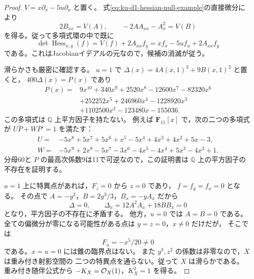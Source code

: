 \begin{proof}
$V=x\partial_x-5u\partial_u$ と置く。
式\eqref{eq:ku-d1-hessian-null-example}の直接微分により
\begin{equation}\label{eq:ku-d1-hessian-null-identities}
 2B_{xx}=V(A),\qquad -2AA_{xx}-A_x^2=V(B)
\end{equation}
を得る。従って多項式環の中で既に
\begin{equation}\label{eq:ku-d1-hessian-exact-syzygy}
 \det\operatorname{Hess}_{x,y}(f)
 =V(f)+2A_{xx}f_y
 =xf_x-5uf_u+2A_{xx}f_y
\end{equation}
である。これはJacobianイデアルの元なので，候補の消滅が従う。

滑らかさも厳密に確認する。
$u=1$ で $\Delta(x)=4A(x,1)^3+9B(x,1)^2$ と置くと，
$400\Delta(x)=P(x)$ であり
\begin{equation}\label{eq:ku-d1-hessian-discriminant}
 \begin{split}
 P(x)={}&9x^{10}+340x^9+2520x^8-12600x^7-82320x^6\\
       &+252252x^5+246960x^4-1228920x^3\\
       &+1102500x^2-123480x-155036.
 \end{split}
\end{equation}
この多項式は $\mathbb Q$ 上平方因子を持たない。
例えば $\mathbf F_{11}[x]$ で，次の二つの多項式が
$U\overline P+W\overline P'=1$ を満たす：
\begin{equation}\label{eq:ku-d1-hessian-bezout}
 \begin{split}
 U={}&-5x^8+5x^7+5x^6+x^5-5x^4+4x^3+4x^2+5x-3,\\
 W={}&-5x^9+2x^8-5x^7-3x^6-4x^5-4x^4
           +5x^3-4x^2+1.
 \end{split}
\end{equation}
分母60と $P$ の最高次係数9は11で可逆なので，この証明書は
$\mathbb Q$ 上の平方因子の不存在を証明する。

$u=1$ 上に特異点があれば，$F_z=0$ から $z=0$ であり，
$f=f_y=f_x=0$ となる。
その点で $A=-y^2$，$B=2y^3/3$，$B_x=-yA_x$ だから
\[
 \Delta=0,\qquad
 \Delta_x=12A^2A_x+18BB_x=0
\]
となり，平方因子の不存在に矛盾する。
他方，$u=0$ では $A=B=0$ である。
全ての偏微分が零になる可能性がある点は $y=z=0$，$x\ne0$ だけだが，
そこでは
\[
                             F_u=-x^5/20\ne0
\]
である。$x=u=0$ には錐の臨界点はない。
また $y^3,z^2$ の係数は非零なので，$X$ は重み付き射影空間の
二つの特異点を通らない。従って $X$ は滑らかである。
重み付き随伴公式から $-K_X=\mathcal O_X(1)$，$K_X^2=1$ を得る。
\end{proof}

